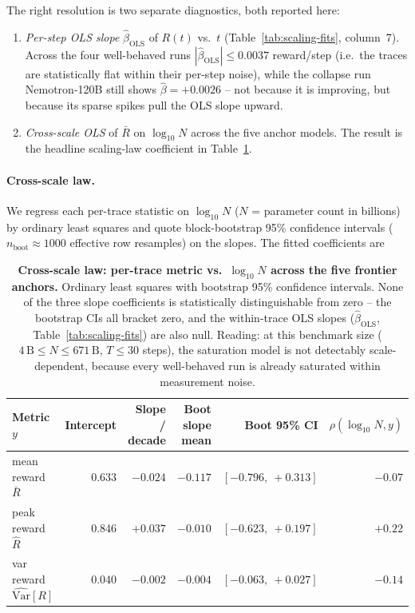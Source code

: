 \documentclass{article}
\providecommand{\tableref}[1]{Table~\ref{#1}}
\begin{document}
The right resolution is two separate diagnostics, both reported
here:

\begin{enumerate}
  \item \emph{Per-step OLS slope} $\hat\beta_{\text{OLS}}$ of
    $R(t)$ vs.~$t$ (Table~\ref{tab:scaling-fits}, column~7).
    Across the four well-behaved runs
    $|\hat\beta_{\text{OLS}}| \le 0.0037$ reward/step (i.e.\ the
    traces are statistically flat within their per-step noise),
    while the collapse run Nemotron-120B still shows $\hat\beta
    = +0.0026$ -- not because it is improving, but because its
    sparse spikes pull the OLS slope upward.
  \item \emph{Cross-scale OLS} of $\bar R$ on $\log_{10} N$
    across the five anchor models.  The result is the headline
    scaling-law coefficient in
    Table~\ref{tab:scaling-cross}.
\end{enumerate}

\paragraph{Cross-scale law.}
\label{par:cross-scale}
We regress each per-trace statistic on $\log_{10} N$
(\(N\) = parameter count in billions) by ordinary least squares and
quote block-bootstrap 95\% confidence intervals
($n_{\text{boot}} \approx 1000$ effective row resamples) on
the slopes.  The fitted coefficients are

\begin{table}[t]
  \centering
  \small
  \begin{tabular}{lrrrrr}
    \toprule
    Metric $y$ & Intercept & Slope / decade &
                  Boot slope mean & Boot 95\% CI &
                  $\rho(\log_{10} N, y)$ \\
    \midrule
    mean reward $\bar R$  & 0.633 & $-0.024$ & $-0.117$ & $[-0.796,\ +0.313]$ & $-0.07$ \\
    peak reward $\hat R$  & 0.846 & $\mathbf{+0.037}$ & $-0.010$ & $[-0.623,\ +0.197]$ & $+0.22$ \\
    var reward $\widehat{\text{Var}}[R]$ & 0.040 & $-0.002$ & $-0.004$ & $[-0.063,\ +0.027]$ & $-0.14$ \\
    \bottomrule
  \end{tabular}
  \caption{\textbf{Cross-scale law: per-trace metric vs.~$\log_{10} N$
    across the five frontier anchors.}
    Ordinary least squares with bootstrap 95\% confidence intervals.
    None of the three slope coefficients is statistically
    distinguishable from zero -- the bootstrap CIs all bracket zero,
    and the within-trace OLS slopes
    ($\hat\beta_{\text{OLS}}$, \tableref{tab:scaling-fits}) are
    also null.  Reading: at this benchmark size ($4\,\text{B}
    \le N \le 671\,\text{B}$, $T\!\le\!30$ steps), the saturation
    model is not detectably scale-dependent, because every
    well-behaved run is already saturated within measurement noise.}
  \label{tab:scaling-cross}
\end{table}
\end{document}

